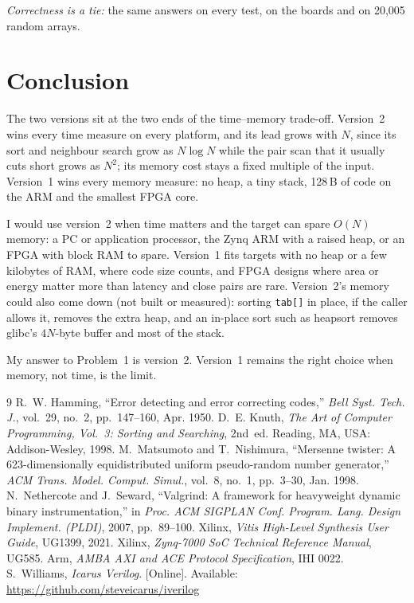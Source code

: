 \documentclass[conference,a4paper]{IEEEtran}
\newcommand{\code}[1]{\texttt{#1}}
\begin{document}
\emph{Correctness is a tie:} the same answers on every test, on the boards and
on 20,005 random arrays.

\section{Conclusion}
The two versions sit at the two ends of the time--memory trade-off. Version~2
wins every time measure on every platform, and its lead grows with $N$, since
its sort and neighbour search grow as $N\log N$ while the pair scan that it
usually cuts short grows as $N^2$; its memory cost stays a fixed multiple of the
input. Version~1 wins every memory measure: no heap, a tiny stack, 128\,B of
code on the ARM and the smallest FPGA core.

I would use version~2 when time matters and the target can spare $O(N)$ memory:
a PC or application processor, the Zynq ARM with a raised heap, or an FPGA with
block RAM to spare. Version~1 fits targets with no heap or a few kilobytes of
RAM, where code size counts, and FPGA designs where area or energy matter more
than latency and close pairs are rare. Version~2's memory could also come down
(not built or measured): sorting \code{tab[]} in place, if the caller allows it,
removes the extra heap, and an in-place sort such as heapsort removes glibc's
$4N$-byte buffer and most of the stack.

My answer to Problem~1 is version~2. Version~1 remains the right choice when
memory, not time, is the limit.

\begin{thebibliography}{9}
 R.~W. Hamming, ``Error detecting and error correcting codes,''
  \emph{Bell Syst. Tech. J.}, vol.~29, no.~2, pp.~147--160, Apr. 1950.
 D.~E. Knuth, \emph{The Art of Computer Programming, Vol.~3:
  Sorting and Searching}, 2nd~ed. Reading, MA, USA: Addison-Wesley, 1998.
 M.~Matsumoto and T.~Nishimura, ``Mersenne twister: A
  623-dimensionally equidistributed uniform pseudo-random number generator,''
  \emph{ACM Trans. Model. Comput. Simul.}, vol.~8, no.~1, pp.~3--30, Jan. 1998.
 N.~Nethercote and J.~Seward, ``Valgrind: A framework for
  heavyweight dynamic binary instrumentation,'' in \emph{Proc. ACM SIGPLAN Conf.
  Program. Lang. Design Implement. (PLDI)}, 2007, pp.~89--100.
 Xilinx, \emph{Vitis High-Level Synthesis User Guide}, UG1399,
  2021.
 Xilinx, \emph{Zynq-7000 SoC Technical Reference Manual}, UG585.
 Arm, \emph{AMBA AXI and ACE Protocol Specification}, IHI 0022.
 S.~Williams, \emph{Icarus Verilog}. [Online]. Available:
  \url{https://github.com/steveicarus/iverilog}
\end{thebibliography}
\end{document}
